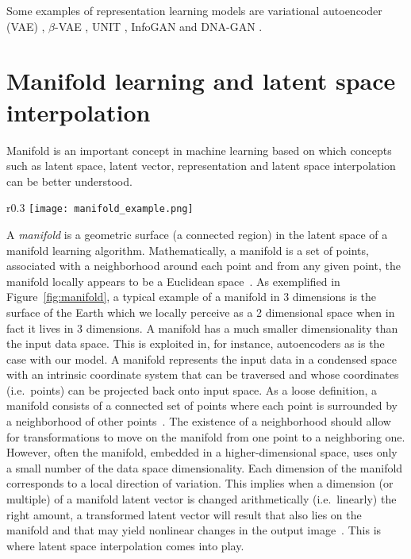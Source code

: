 \documentclass[a4paper,12pt]{report}
\begin{document}
Some examples of representation learning models are variational autoencoder (VAE) \cite{VAE}, $\beta$-VAE \cite{betaVAE}, UNIT \cite{UNIT}, InfoGAN \cite{InfoGAN} and DNA-GAN \cite{DnaGan}.



\section{Manifold learning and latent space interpolation}
Manifold is an important concept in machine learning based on which concepts such as latent space, latent vector, representation and latent space interpolation can be better understood. 

\begin{wrapfigure}{r}{0.3\textwidth}
\centering
\texttt{[image: manifold\_example.png]} 
\caption{Examples of manifolds \cite{Manifold}.}
\label{fig:manifold}
\end{wrapfigure}
A \textit{manifold} is a geometric surface (a connected region) in the latent space of a manifold learning algorithm. Mathematically, a manifold is a set of points, associated with a neighborhood around each point and from any given point, the manifold locally appears to be a Euclidean space~\cite{DeepLearningBook}. As exemplified in Figure~\ref{fig:manifold}, a typical example of a manifold in 3 dimensions is the surface of the Earth which we locally perceive as a 2 dimensional space when in fact it lives in 3 dimensions. A manifold has a much smaller dimensionality than the input data space. This is exploited in, for instance, autoencoders as is the case with our model. A manifold represents the input data in a condensed space with an intrinsic coordinate system that can be traversed and whose coordinates (i.e.\ points) can be projected back onto input space. As a loose definition, a manifold consists of a connected set of points where each point is surrounded by a neighborhood of other points~\cite{DeepLearningBook}. The existence of a neighborhood should allow for transformations to move on the manifold from one point to a neighboring one. However, often the manifold, embedded in a higher-dimensional space, uses only a small number of the data space dimensionality. Each dimension of the manifold corresponds to a local direction of variation. This implies when a dimension (or multiple) of a manifold latent vector is changed arithmetically (i.e.\ linearly) the right amount, a transformed latent vector will result that also lies on the manifold and that may yield nonlinear changes in the output image~\cite{StyleGAN}. This is where latent space interpolation comes into play. 
\end{document}
